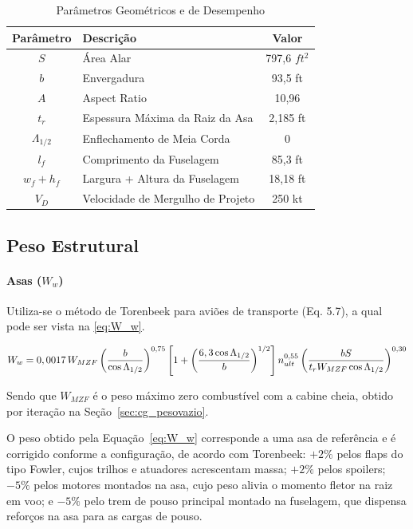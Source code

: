 \begin{table}[H]
  \centering
  \linespread{1}\small
  \setlength{\tabcolsep}{4pt}
  \caption{Parâmetros Geométricos e de Desempenho}
  \label{tab:geometricos_desempenho}
  \begin{tabularx}{\textwidth}{c >{\raggedright\arraybackslash}X c}
    \toprule
    \textbf{Parâmetro} & \textbf{Descrição} & \textbf{Valor} \\
    \midrule
    $S$ & Área Alar & 797,6 $ft^2$ \\
    $b$ & Envergadura & 93,5 ft \\
    $A$ & Aspect Ratio & 10,96 \\
    $t_r$ & Espessura Máxima da Raiz da Asa & 2,185 ft \\
    $\Lambda_{1/2}$ & Enflechamento de Meia Corda & 0 \\
    $l_f$ & Comprimento da Fuselagem & 85,3 ft \\
    $w_f + h_f$ & Largura + Altura da Fuselagem & 18,18 ft \\
    $V_D$ & Velocidade de Mergulho de Projeto & 250 kt \\
    \bottomrule
  \end{tabularx}
\end{table}

\subsection{Peso Estrutural}
\paragraph{Asas ($W_w$)}

Utiliza-se o método de Torenbeek para aviões de transporte (Eq. 5.7), a qual pode ser vista na \autoref{eq:W_w}.

\begin{equation}
\label{eq:W_w}
\small
W_w = 0,0017 \, W_{MZF} \left( \frac{b}{\cos \Lambda_{1/2}} \right)^{0,75}
\left[ 1 + \left( \frac{6,3 \cos \Lambda_{1/2}}{b} \right)^{1/2} \right]
n_{ult}^{0,55}
\left( \frac{bS}{t_r W_{MZF} \cos \Lambda_{1/2}} \right)^{0,30}
\end{equation}

Sendo que $W_{MZF}$ é o peso máximo zero combustível com a cabine cheia, obtido por iteração na Seção~\ref{sec:cg_pesovazio}.

O peso obtido pela Equação~\ref{eq:W_w} corresponde a uma asa de referência e é corrigido conforme a configuração, de acordo com Torenbeek: $+2\%$ pelos flaps do tipo Fowler, cujos trilhos e atuadores acrescentam massa; $+2\%$ pelos spoilers; $-5\%$ pelos motores montados na asa, cujo peso alivia o momento fletor na raiz em voo; e $-5\%$ pelo trem de pouso principal montado na fuselagem, que dispensa reforços na asa para as cargas de pouso.


